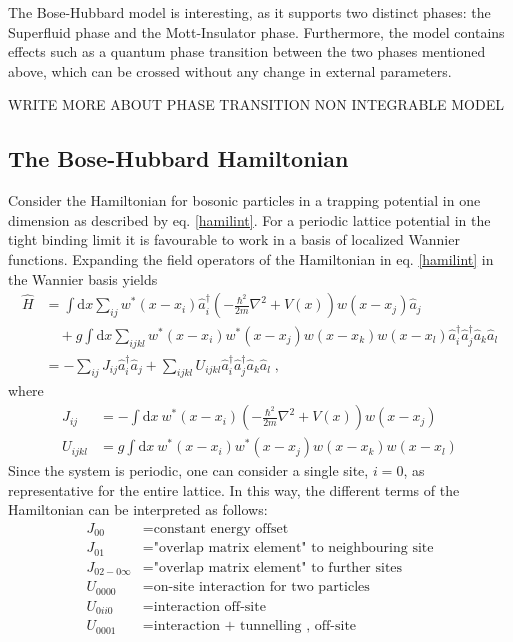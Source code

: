 The Bose-Hubbard model is interesting, as it supports two distinct phases: the Superfluid phase and the Mott-Insulator phase. Furthermore, the model contains effects such as a quantum phase transition between the two phases mentioned above, which can be crossed without any change in external parameters. 

WRITE MORE ABOUT PHASE TRANSITION
NON INTEGRABLE MODEL


\subsection{The Bose-Hubbard Hamiltonian}
Consider the Hamiltonian for bosonic particles in a trapping potential in one dimension as described by eq. \eqref{hamilint}. For a periodic lattice potential in the tight binding limit it is favourable to work in a basis of localized Wannier functions. Expanding the field operators of the Hamiltonian in eq. \eqref{hamilint} in  the Wannier basis yields \cite{Jaksch}
\begin{align}
	\hat{H} &= \int \mathrm{d}x \sum_{i j} w^*(x-x_i) \hat{a}_{i}^{\dag} \left( - \frac{\hbar^2}{2 m} \nabla ^2 + V(x) \right) w(x-x_j) \hat{a}_j \nonumber \\
	& \quad + g \int \mathrm{d}x \sum_{i j k l} w^*(x-x_i) w^*(x-x_j) w(x-x_k) w(x-x_l) \hat{a}_{i}^{\dag} \hat{a}_{j}^{\dag} \hat{a}_{k} \hat{a}_{l} \\
	&= - \sum_{i j } J_{i j} \hat{a}_{i}^{\dag} \hat{a}_{j} + \sum_{i j k l} U_{i j k l} \hat{a}_{i}^{\dag} \hat{a}_{j}^{\dag} \hat{a}_{k} \hat{a}_{l} \; ,
\end{align}
where
\begin{align}
	J_{i j} &= - \int \mathrm{d}x \ w^*(x-x_i) \left( - \frac{\hbar^2}{2 m} \nabla ^2 + V(x) \right) w(x-x_j) \label{eq:BHparamJ} \\
	U_{i j k l} &= g \int \mathrm{d}x \ w^*(x-x_i) w^*(x-x_j) w(x-x_k) w(x-x_l) 
\end{align}
Since the system is periodic, one can consider a single site, $i = 0$, as representative for the entire lattice. In this way, the different terms of the Hamiltonian can be interpreted as follows:
\begin{align}
	J_{0 0} &= \text{constant energy offset} \nonumber \\
	J_{0 1} &= \text{"overlap matrix element" to neighbouring site} \nonumber \\
	J_{0 2 - 0 \infty} &= \text{"overlap matrix element" to further sites} \nonumber \\
	U_{0 0 0 0} &= \text{on-site interaction for two particles} \nonumber \\
	U_{0 i i 0} &= \text{interaction off-site} \nonumber \\
	U_{0 0 0 1} &= \text{interaction  + tunnelling , off-site} \nonumber 
\end{align}
